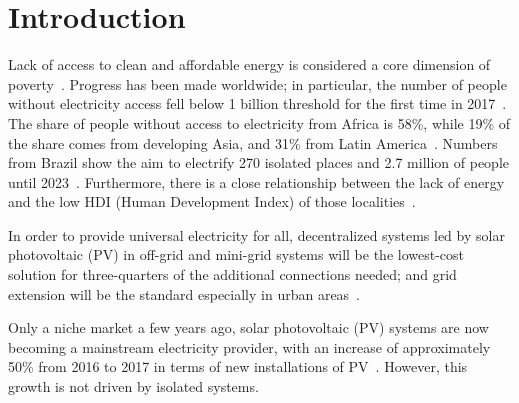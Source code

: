 \documentclass[review]{elsarticle}
\begin{document}
\linenumbers

\section{Introduction}
Lack of access to clean and affordable energy is considered a core dimension of poverty~\cite{Hussein2012}. Progress has been made worldwide; in particular, the number of people without electricity access fell below 1 billion threshold for the first time in 2017~\cite{IEAweo2018}. The share of people without access to electricity from Africa is 58\%, while 19\% of the share comes from developing Asia, and 31\% from Latin America~\cite{IEAweo2018}. Numbers from Brazil show the aim to electrify 270 isolated places and 2.7 million of people until 2023~\cite{EPE2018}. Furthermore, there is a close relationship between the lack of energy and the low HDI (Human Development Index) of those localities~\cite{Coelho}.

In order to provide universal electricity for all, decentralized systems led by solar photovoltaic (PV) in off-grid and mini-grid systems will be the lowest-cost solution for three-quarters of the additional connections needed; and grid extension will be the standard especially in urban areas~\cite{IEAweo2018}.

%
Only a niche market a few years ago, solar photovoltaic (PV) systems are now becoming a mainstream electricity provider, with an increase of approximately 50\% from 2016 to 2017 in terms of new installations of PV~\cite{EPIA}. However, this growth is not driven by isolated systems.
\end{document}
